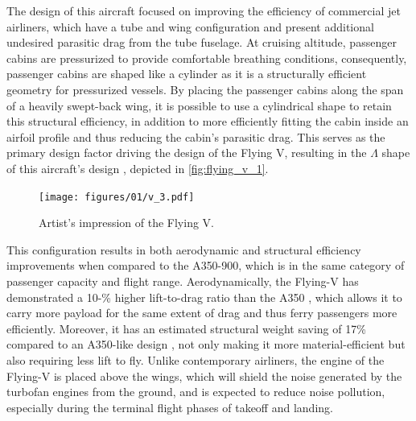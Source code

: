 \documentclass[../report.tex]{subfiles}
\begin{document}
The design of this aircraft focused on improving the efficiency of commercial jet airliners, which have a tube and wing configuration and present additional undesired parasitic drag from the tube fuselage. At cruising altitude, passenger cabins are pressurized to provide comfortable breathing conditions, consequently, passenger cabins are shaped like a cylinder as it is a structurally efficient geometry for pressurized vessels. By placing the passenger cabins along the span of a heavily swept-back wing, it is possible to use a cylindrical shape to retain this structural efficiency, in addition to more efficiently fitting the cabin inside an airfoil profile and thus reducing the cabin's parasitic drag. This serves as the primary design factor driving the design of the Flying V, resulting in the $\Lambda$ shape of this aircraft's design \cite{benad2015flying}, depicted in \autoref{fig:flying_v_1}.

\begin{figure}[h]
    \centering
    \texttt{[image: figures/01/v\_3.pdf]}
    \caption{}
    \caption[notsure what this for]%
    {Artist's impression of the Flying V\footnotemark.}
    \label{fig:flying_v_1}
\end{figure}


This configuration results in both aerodynamic and structural efficiency improvements when compared to the A350-900, which is in the same category of passenger capacity and flight range. Aerodynamically, the Flying-V has demonstrated a 10-\% higher lift-to-drag ratio than the A350 \cite{benad2015flying}, which allows it to carry more payload for the same extent of drag and thus ferry passengers more efficiently. Moreover, it has an estimated structural weight saving of 17\% compared to an A350-like design \cite{claeys2018flying, van2017development}, not only making it more material-efficient but also requiring less lift to fly. Unlike contemporary airliners, the engine of the Flying-V is placed above the wings, which will shield the noise generated by the turbofan engines from the ground, and is expected to reduce noise pollution, especially during the terminal flight phases of takeoff and landing. 
\end{document}
